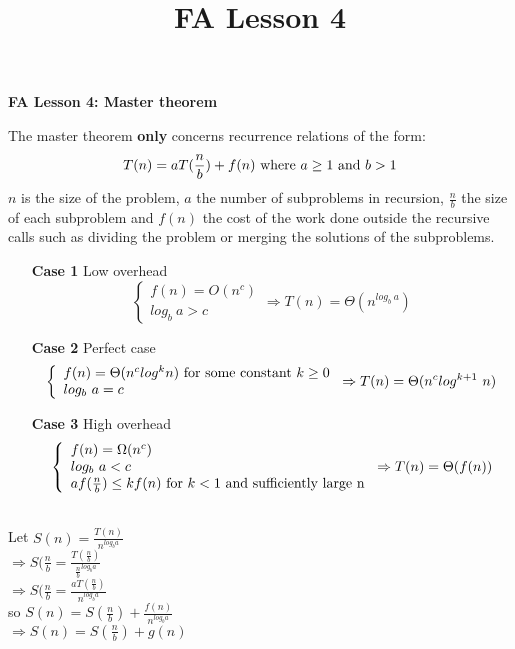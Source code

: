\documentclass[11pt]{article}
\title{FA Lesson 4}
\begin{document}
\begin{center}
\textbf{FA Lesson 4: Master theorem}
\end{center}
The master theorem \textbf{only} concerns recurrence relations of the form:
\begin{equation}T(n)=aT(\frac{n}{b}) + f(n) \textnormal{ where } a \geq 1 \textnormal{ and } b > 1\end{equation}
\newline $n$ is the size of the problem, $a$ the number of subproblems in recursion, 
$\frac{n}{b}$ the size of each subproblem and $f(n)$ the cost of the work done outside the recursive calls
such as dividing the problem or merging the solutions of the subproblems.

\begin{itemize}
    \item [\textbf{Case 1}] Low overhead
    \begin{equation}
    \left\{
        \begin{array}{ll}
            f(n)=O(n^c) \\
            log_b\ a > c
        \end{array}
    \right. \Rightarrow T(n) = \Theta(n^{log_b\ a})
    \end{equation}
    \item [\textbf{Case 2}] Perfect case
    \begin{equation}
    \left\{
        \begin{array}{ll}
            f(n)=\Theta(n^{c}log^{k}n) \textnormal{ for some constant } k \geq 0 \\
            log_b\ a = c
        \end{array}
    \right. \Rightarrow T(n) = \Theta(n^{c}log^{k+1}\ n)
    \end{equation}
    \item [\textbf{Case 3}] High overhead
    \begin{equation}
    \left\{
        \begin{array}{ll}
            f(n)=\Omega(n^c) \\
            log_b\ a < c \\
            af(\frac{n}{b}) \leq kf(n) \textnormal{ for } k < 1 \textnormal{ and sufficiently large n}
        \end{array}
    \right. \Rightarrow T(n) = \Theta(f(n))
    \end{equation}
\end{itemize}
\newline
\\ Let $S(n) = \frac{T(n)}{n^{log_{b}a}}$
\\ $\Rightarrow S(\frac{n}{b} = \frac{T(\frac{n}{b})}{\frac{n}{b}^{log_{b}a}}$
\\ $\Rightarrow S(\frac{n}{b} = \frac{aT(\frac{n}{b})}{n^{log_{b}a}}$
\\ so $S(n) = S(\frac{n}{b}) + \frac{f(n)}{n^{log_{b}a}}$
\\ $\Rightarrow S(n) = S(\frac{n}{b}) + g(n)$
\end{document}
